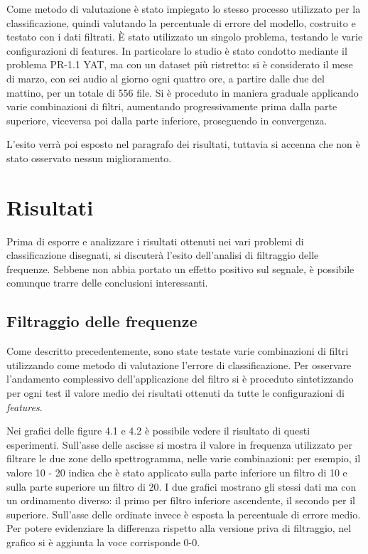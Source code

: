 Come metodo di valutazione è stato impiegato lo stesso processo utilizzato per la
classificazione, quindi valutando la percentuale di errore del modello, costruito e testato con i
dati filtrati. È stato utilizzato un singolo problema, testando le varie configurazioni di
features. In particolare lo studio è stato condotto mediante il problema PR-1.1 YAT, ma con
un dataset più ristretto: si è considerato il mese di marzo, con sei audio al giorno ogni quattro
ore, a partire dalle due del mattino, per un totale di 556 file. Si è proceduto in maniera
graduale applicando varie combinazioni di filtri, aumentando progressivamente prima dalla
parte superiore, viceversa poi dalla parte inferiore, proseguendo in convergenza.

L’esito verrà poi esposto nel paragrafo dei risultati, tuttavia si accenna che non è stato
osservato nessun miglioramento.

\section{Risultati}
Prima di esporre e analizzare i risultati ottenuti nei vari problemi di classificazione disegnati,
si discuterà l’esito dell’analisi di filtraggio delle frequenze. Sebbene non abbia portato un
effetto positivo sul segnale, è possibile comunque trarre delle conclusioni interessanti.

\subsection{Filtraggio delle frequenze}
Come descritto precedentemente, sono state testate varie combinazioni di filtri utilizzando
come metodo di valutazione l’errore di classificazione. Per osservare l’andamento complessivo 
dell’applicazione del filtro si è proceduto sintetizzando per ogni test il valore
medio dei risultati ottenuti da tutte le configurazioni di \textit{features}.

Nei grafici delle figure 4.1 e 4.2 è possibile vedere il risultato di questi esperimenti. Sull’asse delle
ascisse si mostra il valore in frequenza utilizzato per filtrare le due zone dello spettrogramma,
nelle varie combinazioni: per esempio, il valore 10 - 20 indica che è stato applicato sulla
parte inferiore un filtro di 10 e sulla parte superiore un filtro di 20. I due grafici mostrano gli
stessi dati ma con un ordinamento diverso: il primo per filtro inferiore ascendente, il secondo
per il superiore. Sull’asse delle ordinate invece è esposta la percentuale di errore medio. Per
potere evidenziare la differenza rispetto alla versione priva di filtraggio, nel grafico si è
aggiunta la voce corrisponde 0-0.

